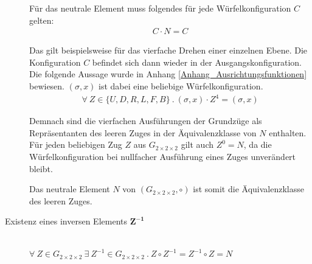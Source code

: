 \documentclass[12pt,a4paper, usenames, dvipsnames]{article}
\theoremstyle{mystyle}
\theoremstyle{definition}
\newcommand{\Gtwo}{\ensuremath{G_{2\times 2\times 2}}}
\begin{document}
\begin{description}
Für das neutrale Element muss folgendes für jede Würfelkonfiguration $C$ gelten:
\begin{align*}
C \cdot N = C
\end{align*}

Das gilt beispielsweise für das vierfache Drehen einer einzelnen Ebene. Die Konfiguration $C$ befindet sich dann wieder in der Ausgangskonfiguration. Die folgende Aussage wurde in Anhang \ref{Anhang_Ausrichtungsfunktionen} bewiesen. $(\sigma, x)$ ist dabei eine beliebige Würfelkonfiguration.
\begin{align*}
\forall \ Z \in \{U, D, R, L, F, B\} \ . \ (\sigma, x) \cdot Z^4 = (\sigma, x)
\end{align*}

Demnach sind die vierfachen Ausführungen der Grundzüge als Repräsentanten des leeren Zuges in der Äquivalenzklasse von $N$ enthalten.
Für jeden beliebigen Zug $Z$ aus $\Gtwo$ gilt auch $Z^0=N$, da die Würfelkonfiguration bei nullfacher Ausführung eines Zuges unverändert bleibt.

Das neutrale Element $N$ von $(\Gtwo, \circ)$ ist somit die Äquivalenzklasse des leeren Zuges.


\item [Existenz eines inversen Elements $\boldsymbol{Z^{-1}}$] \ \\
$\forall \  Z \in \Gtwo \ \exists \  Z^{-1} \in \Gtwo \ .  \ Z \circ Z^{-1} = Z^{-1} \circ Z = N$  



\end{description}
\end{document}
